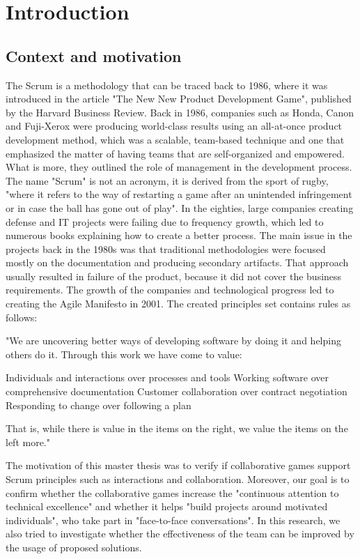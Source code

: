 \chapter{Introduction}
\section{Context and motivation}
The Scrum is a methodology that can be traced back to 1986, where it was introduced in the article "The New New Product Development Game"\cite{ScrumHarvardBib, ScrumBook}, published by the Harvard Business Review. Back in 1986, companies such as Honda, Canon and Fuji-Xerox were producing world-class results using an all-at-once product development method, which was a scalable, team-based technique and one that emphasized the matter of having teams that are self-organized and empowered. What is more, they outlined the role of management in the development process. The name "Scrum" is not an acronym, it is derived from the sport of rugby, "where it refers to the way of restarting a game after an unintended infringement or in case the ball has gone out of play"\cite{AgileBook}. In the eighties, large companies creating defense and IT projects were failing due to frequency growth, which led to numerous books explaining how to create a better process. The main issue in the projects back in the 1980s was that traditional methodologies were focused mostly on the documentation and producing secondary artifacts. That approach usually resulted in failure of the product, because it did not cover the business requirements. The growth of the companies and technological progress led to creating the Agile Manifesto in 2001\cite{AgileManifesto, AgileBook}. The created principles set contains rules as follows:

"We are uncovering better ways of developing
software by doing it and helping others do it.
Through this work we have come to value:

Individuals and interactions over processes and tools \hfill \break
Working software over comprehensive documentation \hfill \break
Customer collaboration over contract negotiation \hfill \break
Responding to change over following a plan \hfill \break

That is, while there is value in the items on
the right, we value the items on the left more."\cite{AgileManifesto}

The motivation of this master thesis was to verify if collaborative games support Scrum principles\cite{AgileManifesto} such as interactions and collaboration. Moreover, our goal is to confirm whether the collaborative games increase the "continuous attention to technical excellence" and whether it helps "build projects around motivated individuals", who take part in "face-to-face conversations". In this research, we also tried to investigate whether the effectiveness of the team can be improved by the usage of proposed solutions.

